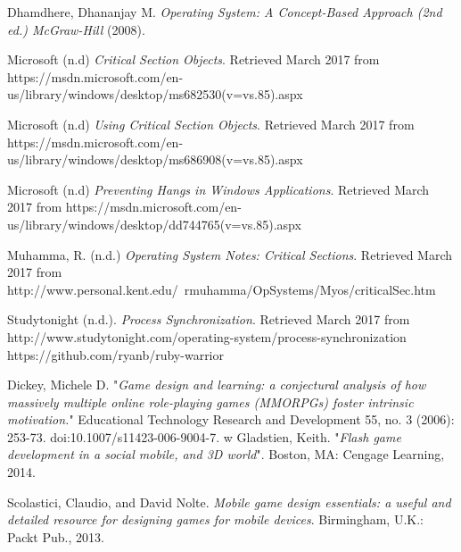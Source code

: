 \documentclass{acm_proc_article-sp}
\begin{document}
\begin{thebibliography}{7}
 
\bibitem{} 
Dhamdhere, Dhananjay M.
\textit{Operating System: A Concept-Based Approach (2nd ed.) McGraw-Hill} (2008). 

\bibitem{} 
Microsoft (n.d)
\textit{Critical Section Objects}. 
Retrieved March 2017 from   https://msdn.microsoft.com/en-us/library/windows/desktop/ms682530(v=vs.85).aspx    
 
\bibitem{} 
Microsoft (n.d)
\textit{Using Critical Section Objects}. 
 Retrieved March 2017 from https://msdn.microsoft.com/en-us/library/windows/desktop/ms686908(v=vs.85).aspx

\bibitem{} 
Microsoft (n.d)
\textit{Preventing Hangs in Windows Applications}. 
 Retrieved March 2017 from https://msdn.microsoft.com/en-us/library/windows/desktop/dd744765(v=vs.85).aspx

 \bibitem{} 
Muhamma, R. (n.d.)
\textit{Operating System Notes: Critical Sections}. 
 Retrieved March 2017 from http://www.personal.kent.edu/~rmuhamma/OpSystems/Myos/criticalSec.htm
 
 \bibitem{} 
Studytonight (n.d.).
\textit{Process Synchronization}. 
 Retrieved March 2017 from http://www.studytonight.com/operating-system/process-synchronization
https://github.com/ryanb/ruby-warrior

\bibitem{}
Dickey, Michele D. "\textit{Game design and learning: a conjectural analysis of how massively multiple online role-playing games (MMORPGs) foster intrinsic motivation.}" Educational Technology Research and Development 55, no. 3 (2006): 253-73. doi:10.1007/s11423-006-9004-7.
w
\bibitem{}
Gladstien, Keith. "\textit{Flash game development in a social mobile, and 3D world}". Boston, MA: Cengage Learning, 2014.

\bibitem{}
Scolastici, Claudio, and David Nolte. \textit{Mobile game design essentials: a useful and detailed resource for designing games for mobile devices}. Birmingham, U.K.: Packt Pub., 2013.
\end{thebibliography}
\end{document}
